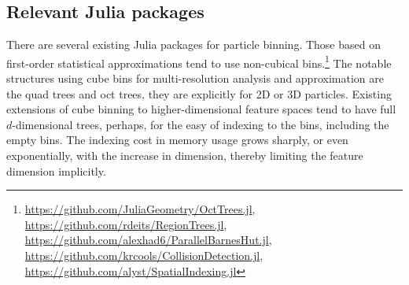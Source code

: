 \documentclass[final]{juliacon}
\begin{document}
%
%
%
%
%

\subsection{Relevant Julia packages}
\label{sec:existing-works}

There are several existing Julia packages for particle binning.  Those
based on first-order statistical approximations tend to use
non-cubical bins.\footnote{%
  \href{https://github.com/JuliaGeometry/OctTrees.jl}{https://github.com/JuliaGeometry/OctTrees.jl},\\
  \href{https://github.com/rdeits/RegionTrees.jl}{https://github.com/rdeits/RegionTrees.jl},\\
  \href{https://github.com/alexhad6/ParallelBarnesHut.jl}{https://github.com/alexhad6/ParallelBarnesHut.jl},\\
  \href{https://github.com/krcools/CollisionDetection.jl}{https://github.com/krcools/CollisionDetection.jl},\\
  \href{https://github.com/alyst/SpatialIndexing.jl}{https://github.com/alyst/SpatialIndexing.jl}
} The notable structures using cube bins for multi-resolution analysis
and approximation are the quad trees and oct trees, they are
explicitly for 2D or 3D particles. Existing extensions of cube binning
to higher-dimensional feature spaces tend to have full $d$-dimensional
trees, perhaps, for the easy of indexing to the bins, including the
empty bins. The indexing cost in memory usage grows sharply, or even
exponentially, with the increase in dimension, thereby limiting the
feature dimension implicitly.

%
%
%
%
%
%
%
\end{document}
